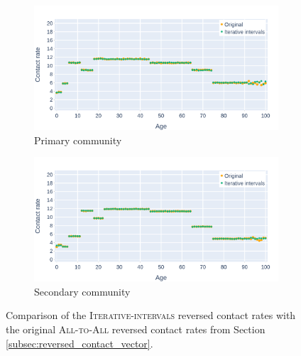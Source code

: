 \begin{figure}\ContinuedFloat
    \centering
    \begin{subfigure}{.8\linewidth}
        \centering
        \includegraphics[width=\textwidth]{4 - Sampling/fig/iterative_intervals/ii_vs_standard_reverse_cr_primary.png}
        \caption{Primary community}
        \label{fig:ii_vs_standard_reversed_cr_standard_primary}
    \end{subfigure}
    \begin{subfigure}{.8\linewidth}
        \centering
        \includegraphics[width=\textwidth]{4 - Sampling/fig/iterative_intervals/ii_vs_standard_reverse_cr_secondary.png}
        \caption{Secondary community}
        \label{fig:ii_vs_standard_reversed_cr_standard_secondary}
    \end{subfigure}
    \caption{Comparison of the \textsc{Iterative-intervals} reversed contact rates with the original \textsc{All-to-All} reversed contact rates from Section \ref{subsec:reversed_contact_vector}.}
    \label{fig:ii_vs_standard_reverse_cr}
\end{figure}

